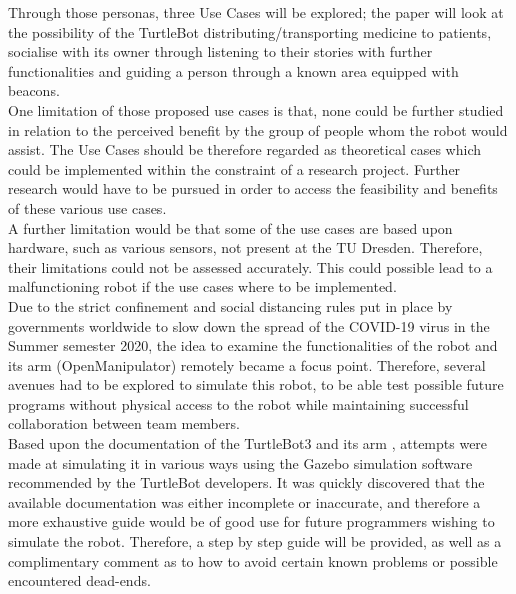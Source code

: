 \documentclass[plainarticle,zihtitle,english,final,hyperref,utf8]{zihpub}
\begin{document}
\newline
Through those personas, three Use Cases will be explored; the paper will look at the possibility of the TurtleBot distributing/transporting medicine to patients, socialise with its owner through listening to their stories with further functionalities and guiding a person through a known area equipped with beacons.\\
\newline
One limitation of those proposed use cases is that, none could be further studied in relation to the perceived benefit by the group of people whom the robot would assist. The Use Cases should be therefore regarded as theoretical cases which could be implemented within the constraint of a research project. Further research would have to be pursued in order to access the feasibility and benefits of these various use cases.\\
\newline
A further limitation would be that some of the use cases are based upon hardware, such as various sensors, not present at the TU Dresden. Therefore, their limitations could not be assessed accurately. This could possible lead to a malfunctioning robot if the use cases where to be implemented.\\
\newline
Due to the strict confinement and social distancing rules put in place by governments worldwide to slow down the spread of the COVID-19 virus in the Summer semester 2020, the idea to examine the functionalities of the robot and its arm (OpenManipulator) remotely became a focus point. Therefore, several avenues had to be explored to simulate this robot, to be able test possible future programs without physical access to the robot while maintaining successful collaboration between team members.\\
\newline
Based upon the documentation of the TurtleBot3 and its arm \cite{tb3docu} \cite{openmandocu}, attempts were made at simulating it in various ways using the Gazebo simulation software recommended by the TurtleBot developers. It was quickly discovered that the available documentation was either incomplete or inaccurate, and therefore a more exhaustive guide would be of good use for future programmers wishing to simulate the robot. Therefore, a step by step guide will be provided, as well as a complimentary comment as to how to avoid certain known problems or possible encountered dead-ends.\\
\newline
\end{document}
